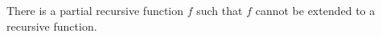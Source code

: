 There is a partial recursive function $f$ such that $f$ cannot be extended to a recursive function.
